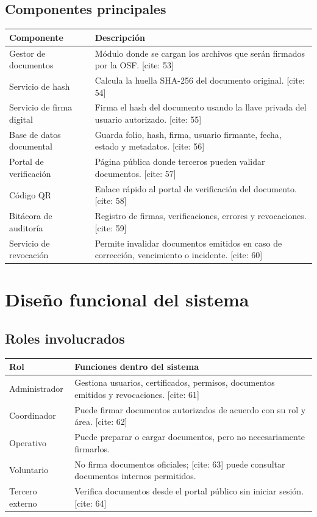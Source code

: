\documentclass[10pt]{article} [cite: 1]
\begin{document}
\subsection{Componentes principales}

\begin{longtable}{p{4cm}p{10cm}}
\toprule
\textbf{Componente} & \textbf{Descripción} \\
\midrule
Gestor de documentos & Módulo donde se cargan los archivos que serán firmados por la OSF. [cite: 53] \\
Servicio de hash & Calcula la huella SHA-256 del documento original. [cite: 54] \\
Servicio de firma digital & Firma el hash del documento usando la llave privada del usuario autorizado. [cite: 55] \\
Base de datos documental & Guarda folio, hash, firma, usuario firmante, fecha, estado y metadatos. [cite: 56] \\
Portal de verificación & Página pública donde terceros pueden validar documentos. [cite: 57] \\
Código QR & Enlace rápido al portal de verificación del documento. [cite: 58] \\
Bitácora de auditoría & Registro de firmas, verificaciones, errores y revocaciones. [cite: 59] \\
Servicio de revocación & Permite invalidar documentos emitidos en caso de corrección, vencimiento o incidente. [cite: 60] \\
\bottomrule
\end{longtable}

\section{Diseño funcional del sistema}

\subsection{Roles involucrados}

\begin{longtable}{p{3cm}p{11cm}}
\toprule
\textbf{Rol} & \textbf{Funciones dentro del sistema} \\
\midrule
Administrador & Gestiona usuarios, certificados, permisos, documentos emitidos y revocaciones. [cite: 61] \\
Coordinador & Puede firmar documentos autorizados de acuerdo con su rol y área. [cite: 62] \\
Operativo & Puede preparar o cargar documentos, pero no necesariamente firmarlos. \\
Voluntario & No firma documentos oficiales; [cite: 63] puede consultar documentos internos permitidos. \\
Tercero externo & Verifica documentos desde el portal público sin iniciar sesión. [cite: 64] \\
\bottomrule
\end{longtable}
\end{document}
